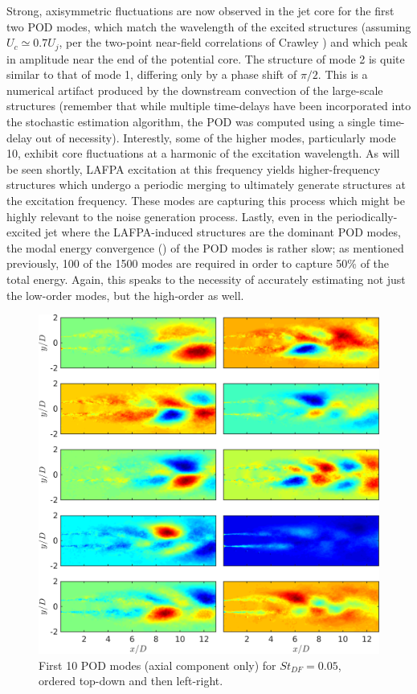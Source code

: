 Strong, axisymmetric fluctuations are now observed in the jet core for the first two POD modes, which match the wavelength of the excited structures (assuming $U_c \simeq 0.7 U_j$, per the two-point near-field correlations of Crawley \etal \citep{Crawley2015}) and which peak in amplitude near the end of the potential core.
The structure of mode 2 is quite similar to that of mode 1, differing only by a phase shift of $\pi/2$. 
This is a numerical artifact produced by the downstream convection of the large-scale structures (remember that while multiple time-delays have been incorporated into the stochastic estimation algorithm, the POD was computed using a single time-delay out of necessity).
Interestly, some of the higher modes, particularly mode 10, exhibit core fluctuations at a harmonic of the excitation wavelength.
As will be seen shortly, LAFPA excitation at this frequency yields higher-frequency structures which undergo a periodic merging to ultimately generate structures at the excitation frequency. 
These modes are capturing this process which might be highly relevant to the noise generation process. 
Lastly, even in the periodically-excited jet where the LAFPA-induced structures are the dominant POD modes, the modal energy convergence () of the POD modes is rather slow; as mentioned previously, 100 of the 1500 modes are required in order to capture 50\% of the total energy.
Again, this speaks to the necessity of accurately estimating not just the low-order modes, but the high-order as well.
\begin{figure}
	\centering
	\includegraphics[width=1\linewidth]{Figures/ch4_St005_POD_Modes.png}
	\caption{First 10 POD modes (axial component only) for $St_{DF} = 0.05$, ordered top-down and then left-right.}
	\label{fig:ch4_St005_PODmodes}
\end{figure}
